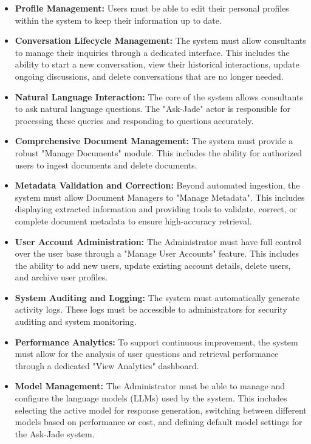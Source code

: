 \renewcommand{\labelitemi}{\large$\bullet$}
\begin{itemize}[noitemsep, topsep=2pt]
    \item \textbf{Profile Management:} Users must be able to edit their personal profiles within the system to keep their information up to date.
    \item \textbf{Conversation Lifecycle Management:} The system must allow consultants to manage their inquiries through a dedicated interface. This includes the ability to start a new conversation, view their historical interactions, update ongoing discussions, and delete conversations that are no longer needed.
    \item \textbf{Natural Language Interaction:} The core of the system allows consultants to ask natural language questions. The "Ask-Jade" actor is responsible for processing these queries and responding to questions accurately.
    \item \textbf{Comprehensive Document Management:} The system must provide a robust "Manage Documents" module. This includes the ability for authorized users to ingest documents and delete documents.
    \item \textbf{Metadata Validation and Correction:} Beyond automated ingestion, the system must allow Document Managers to "Manage Metadata". This includes displaying extracted information and providing tools to validate, correct, or complete document metadata to ensure high-accuracy retrieval.
    \item \textbf{User Account Administration:} The Administrator must have full control over the user base through a "Manage User Accounts" feature. This includes the ability to add new users, update existing account details, delete users, and archive user profiles.
    \item \textbf{System Auditing and Logging:} The system must automatically generate activity logs. These logs must be accessible to administrators for security auditing and system monitoring.
    \item \textbf{Performance Analytics:} To support continuous improvement, the system must allow for the analysis of user questions and retrieval performance through a dedicated "View Analytics" dashboard.
    \item \textbf{Model Management:} The Administrator must be able to manage and configure the language models (LLMs) used by the system. This includes selecting the active model for response generation, switching between different models based on performance or cost, and defining default model settings for the Ask-Jade system.
\end{itemize}

